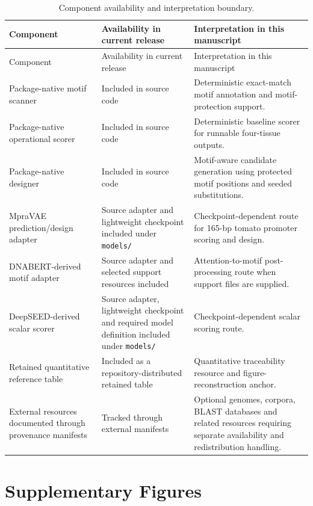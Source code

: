 \documentclass[10pt]{article}
\begin{document}
\begin{longtable}{L{0.22\textwidth}L{0.28\textwidth}L{0.39\textwidth}}
\caption{Component availability and interpretation boundary.}\label{tab:component-boundary}\\
\toprule
Component & Availability in current release & Interpretation in this manuscript \\
\midrule
\endfirsthead
\toprule
Component & Availability in current release & Interpretation in this manuscript \\
\midrule
\endhead
Package-native motif scanner & Included in source code & Deterministic exact-match motif annotation and motif-protection support. \\
Package-native operational scorer & Included in source code & Deterministic baseline scorer for runnable four-tissue outputs. \\
Package-native designer & Included in source code & Motif-aware candidate generation using protected motif positions and seeded substitutions. \\
MpraVAE prediction/design adapter & Source adapter and lightweight checkpoint included under \texttt{models/} & Checkpoint-dependent route for 165-bp tomato promoter scoring and design. \\
DNABERT-derived motif adapter & Source adapter and selected support resources included & Attention-to-motif post-processing route when support files are supplied. \\
DeepSEED-derived scalar scorer & Source adapter, lightweight checkpoint and required model definition included under \texttt{models/} & Checkpoint-dependent scalar scoring route. \\
Retained quantitative reference table & Included as a repository-distributed retained table & Quantitative traceability resource and figure-reconstruction anchor. \\
External resources documented through provenance manifests & Tracked through external manifests & Optional genomes, corpora, BLAST databases and related resources requiring separate availability and redistribution handling. \\
\bottomrule
\end{longtable}

\section{Supplementary Figures}
\end{document}
